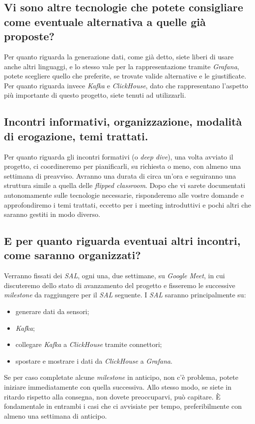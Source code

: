 \subsection{Vi sono altre tecnologie che potete consigliare come eventuale alternativa a quelle già proposte?}
Per quanto riguarda la generazione dati, come già detto, siete liberi di usare anche altri linguaggi, e lo stesso vale per la rappresentazione tramite \textit{Grafana}, potete scegliere quello che preferite, se trovate valide alternative e le giustificate. Per quanto riguarda invece \textit{Kafka} e \textit{ClickHouse}, dato che rappresentano l'aspetto più importante di questo progetto, siete tenuti ad utilizzarli.
\subsection{Incontri informativi, organizzazione, modalità di erogazione, temi trattati.}
Per quanto riguarda gli incontri formativi (o \textit{deep dive}), una volta avviato il progetto, ci coordineremo per pianificarli, su richiesta o meno, con almeno una settimana di preavviso. Avranno una durata di circa un'ora e seguiranno una struttura simile a quella delle \textit{flipped classroom}. Dopo che vi sarete documentati autonomamente sulle tecnologie necessarie, risponderemo alle vostre domande e approfondiremo i temi trattati, eccetto per i meeting introduttivi e pochi altri che saranno gestiti in modo diverso.
\subsection{E per quanto riguarda eventuai altri incontri, come saranno organizzati?}
Verranno fissati dei \textit{SAL}, ogni una, due settimane, su \textit{Google Meet}, in cui discuteremo dello stato di avanzamento del progetto e fisseremo le successive \textit{milestone} da raggiungere per il \textit{SAL} seguente. I \textit{SAL} saranno principalmente su:
\begin{itemize}
    \setlength\itemsep{0em}
    \item generare dati da sensori;
    \item \textit{Kafka};
    \item collegare \textit{Kafka} a \textit{ClickHouse} tramite connettori;
    \item spostare e mostrare i dati da \textit{ClickHouse} a \textit{Grafana}.
\end{itemize}
Se per caso completate alcune \textit{milestone} in anticipo, non c'è problema, potete iniziare immediatamente con quella successiva. Allo stesso modo, se siete in ritardo rispetto alla consegna, non dovete preoccuparvi, può capitare. È fondamentale in entrambi i casi che ci avvisiate per tempo, preferibilmente con almeno una settimana di anticipo.
